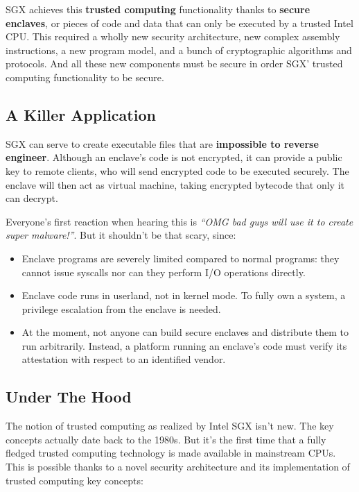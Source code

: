 \documentclass[]{article}
\begin{document}
SGX achieves this \textbf{trusted computing} functionality thanks to
\textbf{secure enclaves}, or pieces of code and data that can only be
executed by a trusted Intel CPU. This required a wholly new security
architecture, new complex assembly instructions, a new program model,
and a bunch of cryptographic algorithms and protocols. And all these new
components must be secure in order SGX' trusted computing functionality
to be secure.

\subsection{A Killer Application}\label{a-killer-application}

SGX can serve to create executable files that are \textbf{impossible to
reverse engineer}. Although an enclave's code is not encrypted, it can
provide a public key to remote clients, who will send encrypted code to
be executed securely. The enclave will then act as virtual machine,
taking encrypted bytecode that only it can decrypt.

Everyone's first reaction when hearing this is \emph{``OMG bad guys will
use it to create super malware!''}. But it shouldn't be that scary,
since:

\begin{itemize}
\item
  Enclave programs are severely limited compared to normal programs:
  they cannot issue syscalls nor can they perform I/O operations
  directly.
\item
  Enclave code runs in userland, not in kernel mode. To fully own a
  system, a privilege escalation from the enclave is needed.
\item
  At the moment, not anyone can build secure enclaves and distribute
  them to run arbitrarily. Instead, a platform running an enclave's code
  must verify its attestation with respect to an identified vendor.
\end{itemize}

\subsection{Under The Hood}\label{under-the-hood}

The notion of trusted computing as realized by Intel SGX isn't new. The
key concepts actually date back to the 1980s. But it's the first time
that a fully fledged trusted computing technology is made available in
mainstream CPUs. This is possible thanks to a novel security
architecture and its implementation of trusted computing key concepts:
\end{document}
